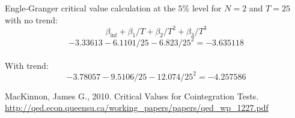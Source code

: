 \documentclass[12pt]{article}
\begin{document}
Engle-Granger critical value calculation at the $5\%$ level for $N=2$ and $T=25$ with no trend:
$$\beta_{\inf} + \beta_{1}/T + \beta_{2}/T^{2}+\beta_3/T^3 $$
$$-3.33613 - 6.1101/25 - 6.823/25^2 = -3.635118$$\\

With trend:
$$-3.78057 - 9.5106/25 - 12.074/25^2 = -4.257586$$

\begin{thebibliography}{9}

MacKinnon, James G., 2010. Critical Values for Cointegration Tests. \url{http://qed.econ.queensu.ca/working_papers/papers/qed_wp_1227.pdf}

\end{thebibliography}
\end{document}

